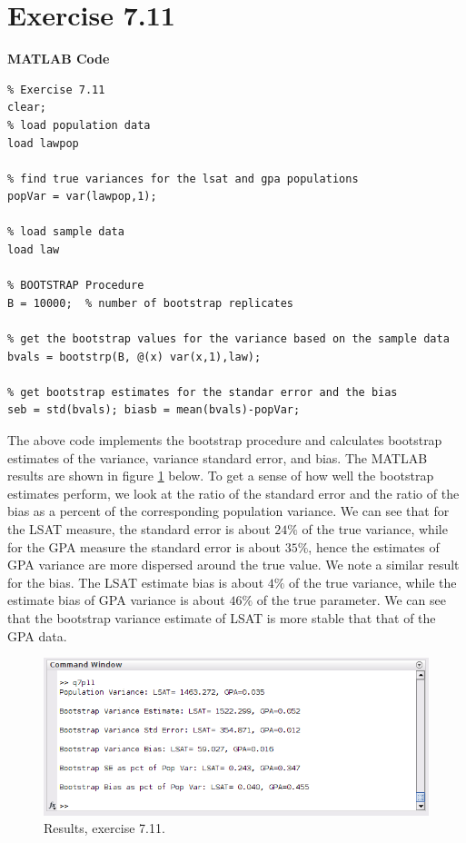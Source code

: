 \documentclass[12pt,a4paper]{article}
\begin{document}
\section*{Exercise 7.11}

\textbf{MATLAB Code}

\begin{verbatim}
% Exercise 7.11
clear;
% load population data
load lawpop

% find true variances for the lsat and gpa populations
popVar = var(lawpop,1);

% load sample data
load law

% BOOTSTRAP Procedure
B = 10000;	% number of bootstrap replicates

% get the bootstrap values for the variance based on the sample data
bvals = bootstrp(B, @(x) var(x,1),law);

% get bootstrap estimates for the standar error and the bias
seb = std(bvals); biasb = mean(bvals)-popVar;

\end{verbatim}

The above code implements the bootstrap procedure and calculates bootstrap estimates of the variance, variance standard error, and bias. The MATLAB results are shown in figure \ref{q7p11 fig1} below. To get a sense of how well the bootstrap estimates perform, we look at the ratio of the standard error and the ratio of the bias as a percent of the corresponding population variance.  We can see that for the LSAT measure, the standard error is about $24\%$ of the true variance, while for the GPA measure the standard error is about $35\%$, hence the estimates of GPA variance are more dispersed around the true value. We note a similar result for the bias. The LSAT estimate bias is about $4\%$ of the true variance, while the estimate bias of GPA variance is about $46\%$ of the true parameter. We can see that the bootstrap variance estimate of LSAT is more stable that that of the GPA data.

\begin{figure}[ht!]
\begin{center}
\includegraphics[scale=.6]{q7p11_result.png}
\caption{Results, exercise 7.11.}
\label{q7p11 fig1}
\end{center}
\end{figure}
\FloatBarrier
\end{document}
